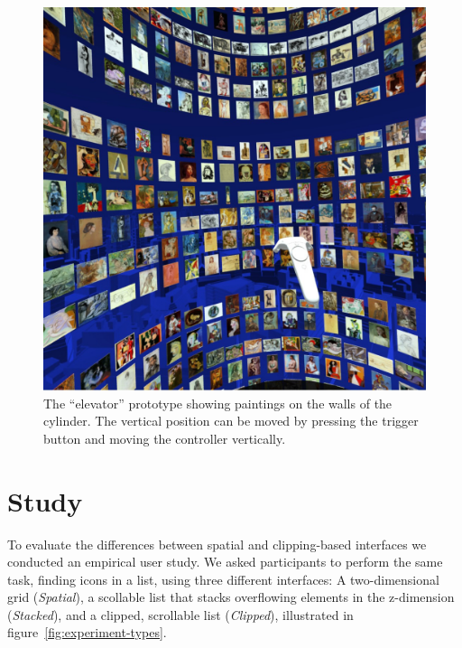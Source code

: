 \documentclass[nobib]{tufte-book} %
\begin{document}
\begin{figure}
  \includegraphics[width=\linewidth]{picassoinside.jpg}
  \caption{The ``elevator'' prototype showing paintings on the walls of the cylinder. The vertical position can be moved by pressing the trigger button and moving the controller vertically.}
  \label{fig:picassoinside}
\end{figure}


\chapter{Study}
\label{ch:study}

To evaluate the differences between spatial and clipping-based interfaces we conducted an empirical user study. We asked participants to perform the same task, finding icons in a list, using three different interfaces: A two-dimensional grid (\emph{Spatial}), a scollable list that stacks overflowing elements in the z-dimension (\emph{Stacked}), and a clipped, scrollable list (\emph{Clipped}), illustrated in figure~\ref{fig:experiment-types}.
\end{document}

